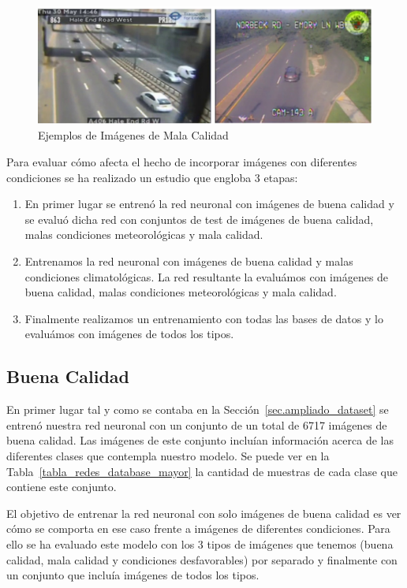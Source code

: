 \begin{figure}[H] 
\begin{center}
	\includegraphics[width=1\textwidth]{figures/Experimentos/mala_calidad.png}
   \caption{Ejemplos de Imágenes de Mala Calidad}
	\label{fig.mala_calidad}
\end{center}
\end{figure}


Para evaluar cómo afecta el hecho de incorporar imágenes con diferentes condiciones se ha realizado un estudio que engloba 3 etapas:

\begin{enumerate}
    \item En primer lugar se entrenó la red neuronal con imágenes de buena calidad y se evaluó dicha red con  conjuntos de test de imágenes de buena calidad, malas condiciones meteorológicas y mala calidad.
    \item Entrenamos la red neuronal con imágenes de buena calidad y malas condiciones climatológicas. La red resultante la evaluámos con imágenes de buena calidad, malas condiciones meteorológicas y mala calidad.
    \item Finalmente realizamos un entrenamiento con todas las bases de datos y lo evaluámos con imágenes de todos los tipos.
\end{enumerate}

\subsection{Buena Calidad}

En primer lugar tal y como se contaba en la Sección~\ref{sec.ampliado_dataset} se entrenó nuestra red neuronal con un conjunto de un total de 6717 imágenes de buena calidad. Las imágenes de este conjunto incluían información acerca de las diferentes clases que contempla nuestro modelo. Se puede ver en la Tabla~\ref{tabla_redes_database_mayor} la cantidad de muestras de cada clase que contiene este conjunto.

El objetivo de entrenar la red neuronal con solo imágenes de buena calidad es ver cómo se comporta en ese caso frente a imágenes de diferentes condiciones. Para ello se ha evaluado este modelo con los 3 tipos de imágenes que tenemos (buena calidad, mala calidad y condiciones desfavorables) por separado y finalmente con un conjunto que incluía imágenes de todos los tipos.

